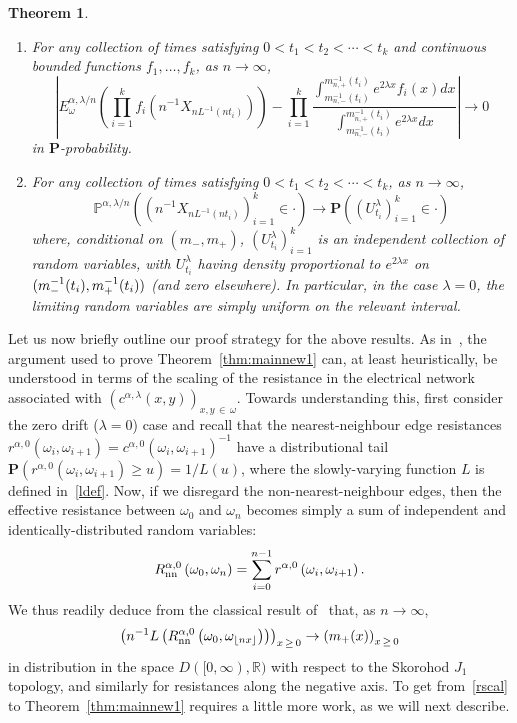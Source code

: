 \documentclass[10pt]{amsart}
\newtheorem{theo}{Theorem}[section]
\theoremstyle{definition}\newtheorem{defi}[theo]{Definition}\newtheorem{rema}[theo]{Remark}\newtheorem{exam}[theo]{Example}\newtheorem{exem}[theo]{Example}\newtheorem{nota}[theo]{Notation}
\newcommand{\R}{\mathbb R}
\renewcommand{\P}{\mathbb P}
\newcommand{\bfP}{\mathbf{P}}
\newcommand*{\alphenumi}{\renewcommand*{\theenumi}{\alph{enumi}}}
\begin{document}
\begin{theo}\label{thm:mainnew3}\leavevmode
\begin{enumerate}\alphenumi
\item\label{theo1.4.a} For any collection of times satisfying $0<t_1<t_2<\cdots<t_k$ and continuous bounded functions $f_1,\dots,f_k$, as $n\rightarrow\infty$,
\[
\left|E^{\alpha,\lambda/n}_\omega\left(\prod_{i=1}^kf_i\left(n^{-1}{X}_{nL^{-1}(nt_i)}\right)\right)-\prod_{i=1}^k\frac{\int_{m_{n,-}^{-1}(t_i)}^{m_{n,+}^{-1}(t_i)}e^{2\lambda x}f_i(x)dx}{\int_{m_{n,-}^{-1}(t_i)}^{m_{n,+}^{-1}(t_i)}e^{2\lambda x}dx}\right|
\rightarrow0
\]
in $\bfP$-probability.
\item\label{theo1.4.b} For any collection of times satisfying $0<t_1<t_2<\cdots<t_k$, as $n\rightarrow\infty$,
\[
\P^{\alpha,\lambda/n}\left(\left(n^{-1}{X}_{nL^{-1}(nt_i)}\right)_{i=1}^k\in \cdot\right)\rightarrow \bfP\left(\left(U^\lambda_{t_i}\right)_{i=1}^k\in\cdot\right)
\]
where, conditional on $(m_-,m_+)$, $(U^\lambda_{t_i})_{i=1}^k$ is an independent collection of random variables, with $U^\lambda_{t_i}$ having density proportional to $e^{2\lambda x}$ on $(m_-^{-1}(t_i),m_+^{-1}\linebreak(t_i))$ (and zero elsewhere). In particular, in the case $\lambda=0$, the limiting random variables are simply uniform on the relevant interval.
\end{enumerate}
\end{theo}


Let us now briefly outline our proof strategy for the above results. As in~\cite{CFJ}, the argument used to prove Theorem~\ref{thm:mainnew1} can, at least heuristically, be understood in terms of the scaling of the resistance in the electrical network associated with $(c^{\alpha,\lambda}(x,y))_{x,y\,\in\,\omega}$. Towards understanding this, first consider the zero drift ($\lambda=0$) case and recall that the nearest-neighbour edge resistances $r^{\alpha,0}(\omega_i,\omega_{i+1})=c^{\alpha,0}(\omega_i,\omega_{i+1})^{-1}$ have a distributional tail $\bfP(r^{\alpha,0}(\omega_i,\omega_{i+1})\geq u)=1/L(u)$, where the slowly-varying function $L$ is defined in~\eqref{ldef}. Now, if we disregard the non-nearest-neighbour edges, then the effective resistance between $\omega_0$ and $\omega_n$ becomes simply a sum of independent and identically-distributed random variables:
\[
R^{\alpha,0}_{\text{\upshape{nn}}}\left(\omega_0,\omega_n\right)=\sum_{i=0}^{n-1}r^{\alpha,0}\left(\omega_{i},\omega_{i+1}\right).
\]
We thus readily deduce from the classical result of~\cite[Theorem~2.1]{Kasa} that, as $n\to\infty$,
\begin{equation}\label{rscal}
\left(n^{-1}L\left(R^{\alpha,0}_{\text{\upshape{nn}}}\left(\omega_0,\omega_{\lfloor nx\rfloor}\right)\right)\right)_{x\,\geq\,0}\rightarrow \left(m_+(x)\right)_{x\,\geq\,0}
\end{equation}
in distribution in the space $D([0,\infty),\R)$ with respect to the Skorohod $J_1$ topology, and similarly for resistances along the negative axis. To get from~\eqref{rscal} to Theorem~\ref{thm:mainnew1} requires a little more work, as we will next describe.
\end{document}
